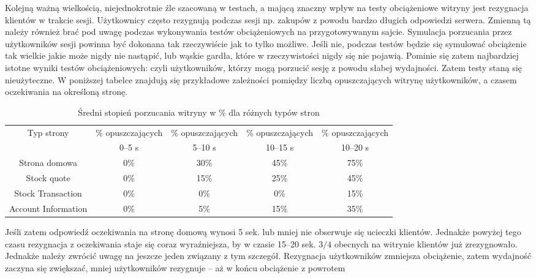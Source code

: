\begin{enumerate}
\begin{description}
Kolejną ważną wielkością, niejednokrotnie źle szacowaną w testach, a mającą znaczny wpływ na testy obciążeniowe 
witryny jest rezygnacja klientów w trakcie sesji. Użytkownicy często rezygnują podczas sesji np. zakupów z powodu bardzo 
długich odpowiedzi serwera. Zmienną tą należy również brać pod uwagę podczas wykonywania testów obciążeniowych na 
przygotowywanym 
sajcie. Symulacja porzucania przez użytkowników sesji powinna być dokonana tak rzeczywiście jak to tylko możliwe. Jeśli nie, 
podczas testów będzie się symulować obciążenie tak wielkie jakie może nigdy nie nastąpić, lub wąskie gardła, które w 
rzeczywistości nigdy się nie pojawią. Pominie się zatem najbardziej istotne wyniki testów obciążeniowych: czyli 
użytkowników, którzy mogą porzucić sesję z powodu słabej wydajności. Zatem testy staną się nieużyteczne. W poniższej 
tabelce znajdują się przykładowe zależności pomiędzy liczbą opuszczających witrynę użytkowników, a czasem oczekiwania na 
określoną stronę.
\begin{table}[h]
\centering
\begin{scriptsize}
\begin{tt}
\begin{tabular}{|c|c|c|c|c|}
\hline
{Typ strony}&{\% opuszczających}&{\% opuszczających}&{\% opuszczających}&{\% opuszczających}\\
{}&{ 0--5 s }&{ 5--10 s }&{ 10--15 s }&{ 10--20 s }\\
\hline\hline
{Strona domowa}&{0\%}&{30\%}&{45\%}&{75\%}\\
\hline
{Stock quote}&{0\%}&{15\%}&{25\%}&{45\%}\\
\hline
{Stock Transaction}&{0\%}&{0\%}&{0\%}&{15\%}\\
\hline
{Account Information}&{0\%}&{5\%}&{15\%}&{35\%}\\
\hline
\end{tabular}
\end{tt}
\caption{Średni stopień porzucania witryny w \% dla różnych typów stron}
\label{porzucanie}
\end{scriptsize}
\end{table}
Jeśli zatem odpowiedź oczekiwania na stronę domową wynosi 5 sek. lub mniej nie obserwuje się ucieczki klientów. Jednakże 
powyżej tego czasu rezygnacja z oczekiwania staje się coraz wyraźniejsza, by w czasie 15--20 sek. $3/4$ obecnych na witrynie 
klientów już zrezygnowało. Jednakże należy zwrócić uwagę na jeszcze jeden związany z tym szczegół. Rezygnacja użytkowników 
zmniejsza obciążenie, zatem wydajność zaczyna się zwiększać, mniej użytkowników rezygnuje -- aż w końcu obciążenie z powrotem 

\end{description}
\end{enumerate}
